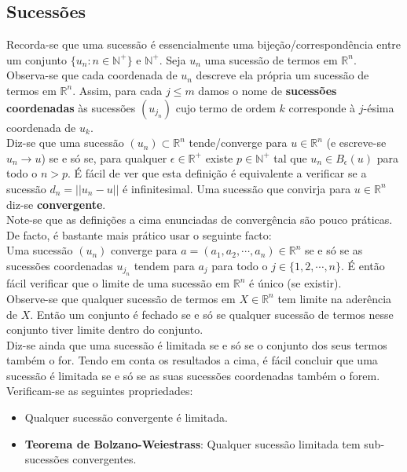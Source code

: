 \documentclass{article}
\begin{document}
\subsection{Sucessões}
Recorda-se que uma sucessão é essencialmente uma bijeção/correspondência entre um conjunto $\{ u_n: n \in \mathbb{N}^+\}$ e $\mathbb{N}^+$.
Seja $u_n$ uma sucessão de termos em $\mathbb{R}^n$. Observa-se que cada coordenada de $u_n$ descreve ela própria um sucessão de termos em $\mathbb{R}^n$. Assim, para cada $j \leq m$ damos o nome de \textbf{sucessões coordenadas} às sucessões $(u_{j_n})$ cujo termo de ordem $k$ corresponde à $j$-ésima coordenada de $u_k$.\\
Diz-se que uma sucessão $(u_n) \subset \mathbb{R}^n$ tende/converge para $u \in \mathbb{R}^n$ (e escreve-se $u_n \to u$) se e só se, para qualquer $\epsilon \in \mathbb{R}^+$ existe $p \in \mathbb{N}^+$ tal que $u_n \in B_\epsilon(u)$ para todo o $n>p$. É fácil de ver que esta definição é equivalente a verificar se a sucessão $d_n = || u_n - u ||$ é infinitesimal. Uma sucessão que convirja para $u \in \mathbb{R}^n$ diz-se \textbf{convergente}.\\
Note-se que as definições a cima enunciadas de convergência são pouco práticas. De facto, é bastante mais prático usar o seguinte facto:\\
Uma sucessão $(u_n)$ converge para $a = (a_1, a_2, \cdots , a_n) \in \mathbb{R}^n$ se e só se as sucessões coordenadas $u_{j_n}$ tendem para $a_j$ para todo o $j \in \{ 1,2, \cdots , n \}$. É então fácil verificar que o limite de uma sucessão em $\mathbb{R}^n$ é único (se existir).\\
Observe-se que qualquer sucessão de termos em $X \in \mathbb{R}^n$ tem limite na aderência de $X$. Então um conjunto é fechado se e só se qualquer sucessão de termos nesse conjunto tiver limite dentro do conjunto.\\
Diz-se ainda que uma sucessão é limitada se e só se o conjunto dos seus termos também o for. Tendo em conta os resultados a cima, é fácil concluir que uma sucessão é limitada se e só se as suas sucessões coordenadas também o forem. Verificam-se as seguintes propriedades:
\begin{itemize}
	\item Qualquer sucessão convergente é limitada.
	\item \textbf{Teorema de Bolzano-Weiestrass}: Qualquer sucessão limitada tem sub-sucessões convergentes.
\end{itemize}
\end{document}
